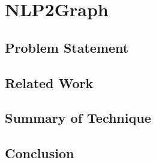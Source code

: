 \chapter{NLP2Graph}
\label{Ch-4:Sec:NLP2Graph}
\section{Problem Statement}


\section{Related Work}

\section{Summary of Technique}

\section{Conclusion}